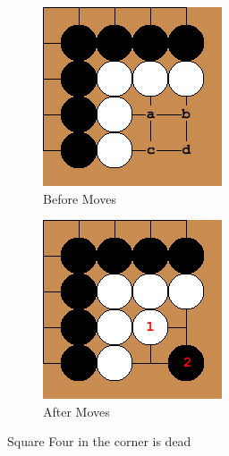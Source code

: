 \documentclass{l4proj}
\begin{document}
\begin{figure}[!ht]
\centering
\begin{subfigure}[b]{0.3\textwidth}
\includegraphics[width=\textwidth]{LD/2a.png}
\caption{Before Moves}
\label{fig:LD-2a}
\end{subfigure}\qquad
\begin{subfigure}[b]{0.3\textwidth}
\includegraphics[width=\textwidth]{LD/2b.png}
\caption{After Moves}
\label{fig:LD-2b}
\end{subfigure}
\caption{Square Four in the corner is dead}
\label{fig:LD-2}
\end{figure}
\end{document}
